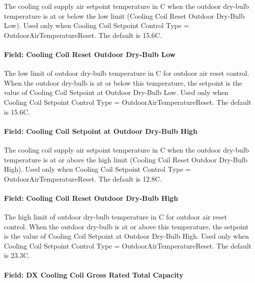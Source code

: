 The cooling coil supply air setpoint temperature in C when the outdoor dry-bulb temperature is at or below the low limit (Cooling Coil Reset Outdoor Dry-Bulb Low). Used only when Cooling Coil Setpoint Control Type = OutdoorAirTemperatureReset. The default is 15.6C.

\paragraph{Field: Cooling Coil Reset Outdoor Dry-Bulb Low}\label{field-cooling-coil-reset-outdoor-dry-bulb-low-2}

The low limit of outdoor dry-bulb temperature in C for outdoor air reset control. When the outdoor dry-bulb is at or below this temperature, the setpoint is the value of Cooling Coil Setpoint at Outdoor Dry-Bulb Low. Used only when Cooling Coil Setpoint Control Type = OutdoorAirTemperatureReset. The default is 15.6C.

\paragraph{Field: Cooling Coil Setpoint at Outdoor Dry-Bulb High}\label{field-cooling-coil-setpoint-at-outdoor-dry-bulb-high-2}

The cooling coil supply air setpoint temperature in C when the outdoor dry-bulb temperature is at or above the high limit (Cooling Coil Reset Outdoor Dry-Bulb High). Used only when Cooling Coil Setpoint Control Type = OutdoorAirTemperatureReset. The default is 12.8C.

\paragraph{Field: Cooling Coil Reset Outdoor Dry-Bulb High}\label{field-cooling-coil-reset-outdoor-dry-bulb-high-2}

The high limit of outdoor dry-bulb temperature in C for outdoor air reset control. When the outdoor dry-bulb is at or above this temperature, the setpoint is the value of Cooling Coil Setpoint at Outdoor Dry-Bulb High. Used only when Cooling Coil Setpoint Control Type = OutdoorAirTemperatureReset. The default is 23.3C.

\paragraph{Field: DX Cooling Coil Gross Rated Total Capacity}\label{field-dx-cooling-coil-gross-rated-total-capacity-1}

